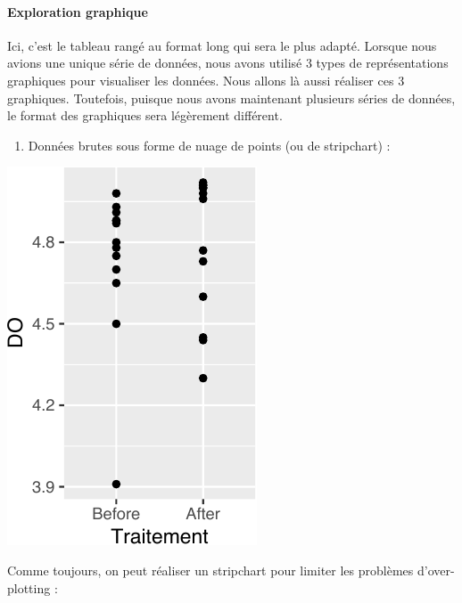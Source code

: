\documentclass[
  a4paper,
]{article}
\newenvironment{Shaded}{\begin{snugshade}}{\end{snugshade}}
\newcommand{\DataTypeTok}[1]{\textcolor[rgb]{0.00,0.34,0.68}{#1}}
\newcommand{\DecValTok}[1]{\textcolor[rgb]{0.69,0.50,0.00}{#1}}
\newcommand{\FloatTok}[1]{\textcolor[rgb]{0.69,0.50,0.00}{#1}}
\newcommand{\KeywordTok}[1]{\textcolor[rgb]{0.12,0.11,0.11}{\textbf{#1}}}
\newcommand{\NormalTok}[1]{\textcolor[rgb]{0.12,0.11,0.11}{#1}}
\newcommand{\OperatorTok}[1]{\textcolor[rgb]{0.12,0.11,0.11}{#1}}
\newcommand{\StringTok}[1]{\textcolor[rgb]{0.75,0.01,0.01}{#1}}
\providecommand{\tightlist}{%
  \setlength{\itemsep}{0pt}\setlength{\parskip}{0pt}}
\begin{document}
\hypertarget{exploration-graphique-1}{%
\paragraph{Exploration graphique}\label{exploration-graphique-1}}

Ici, c'est le tableau rangé au format long qui sera le plus adapté. Lorsque nous avions une unique série de données, nous avons utilisé 3 types de représentations graphiques pour visualiser les données. Nous allons là aussi réaliser ces 3 graphiques. Toutefois, puisque nous avons maintenant plusieurs séries de données, le format des graphiques sera légèrement différent.

\begin{enumerate}
\def\labelenumi{\arabic{enumi}.}
\tightlist
\item
  Données brutes sous forme de nuage de points (ou de stripchart) :
\end{enumerate}

\begin{Shaded}
\end{Shaded}

\begin{center}\includegraphics[width=0.25\linewidth]{figure/unnamed-chunk-31-1} \end{center}

Comme toujours, on peut réaliser un stripchart pour limiter les problèmes d'over-plotting :

\begin{Shaded}
\end{Shaded}
\end{document}
